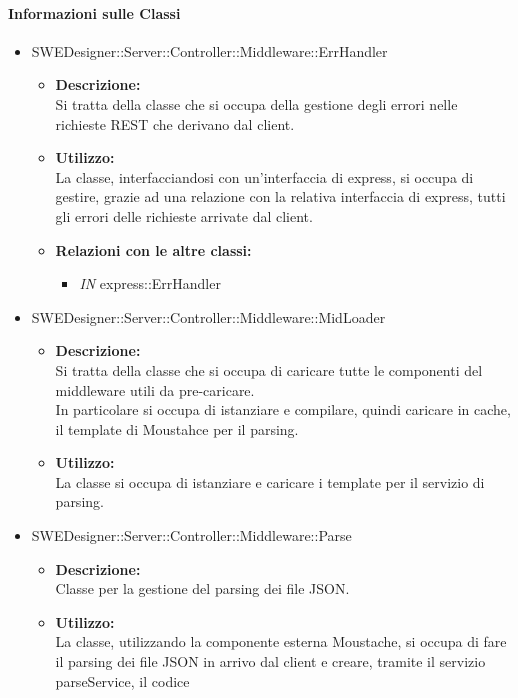 		\paragraph{Informazioni sulle Classi}
		\begin{itemize}
			\item SWEDesigner::Server::Controller::Middleware::ErrHandler
			\begin{itemize}
				\item \textbf{Descrizione: }\\
				Si tratta della classe che si occupa della gestione degli errori nelle richieste REST che derivano dal client.
				\item \textbf{Utilizzo: }\\
				La classe, interfacciandosi con un'interfaccia di express, si occupa di gestire, grazie ad una relazione con la relativa interfaccia di express, tutti gli errori delle richieste arrivate dal client.
				\item \textbf{Relazioni con le altre classi: }
				\begin{itemize}
					\item \emph{IN} express::ErrHandler
				\end{itemize}
			\end{itemize}
			\item SWEDesigner::Server::Controller::Middleware::MidLoader
			\begin{itemize}
				\item \textbf{Descrizione: }\\
				Si tratta della classe che si occupa di caricare tutte le componenti del middleware utili da pre-caricare.\\
				In particolare si occupa di istanziare e compilare, quindi caricare in cache, il template di Moustahce per il parsing.
				\item \textbf{Utilizzo: }\\
				La classe si occupa di istanziare e caricare i template per il servizio di parsing.
			\end{itemize}
			\item SWEDesigner::Server::Controller::Middleware::Parse
			\begin{itemize}
				\item \textbf{Descrizione: }\\
				Classe per la gestione del parsing dei file JSON.
				\item \textbf{Utilizzo: }\\
				La classe, utilizzando la componente esterna Moustache, si occupa di fare il parsing dei file JSON in arrivo dal client e creare, tramite il servizio parseService, il codice

\end{itemize}
\end{itemize}
